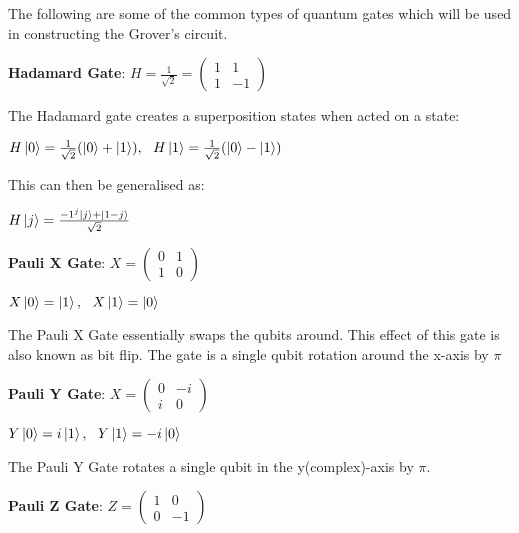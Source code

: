 \documentclass{article}
\begin{document}
\noindent
The following are some of the common types of quantum gates which will be used in constructing the Grover's circuit.
\vspace{5mm}

\textbf{Hadamard Gate}: \qquad $H = \frac{1}{\sqrt{2}}= \begin{pmatrix} 1 & 1 \\ 1 & -1 \end{pmatrix}$
\vspace{5mm}

\noindent
The Hadamard gate creates a superposition states when acted on a state:
\vspace{5mm}


\qquad $H\ket{0} = \frac{1}{\sqrt{2}} (\ket{0} + \ket{1}), \ \ H\ket{1} = \frac{1}{\sqrt{2}}(\ket{0} - \ket{1}) $
\vspace{5mm}

\noindent
This can then be generalised as:
\vspace{5mm}


\qquad $ H\ket{j} = \frac{-1^j\ket{j} + \ket{1 - j}}{\sqrt{2}} $
\vspace{5mm}


\textbf{Pauli X Gate}: \qquad $X = \begin{pmatrix} 0 & 1 \\ 1 & 0 \end{pmatrix}$
\vspace{5mm}


\qquad $X\ket{0} = \ket{1} , \ \ X\ket{1} = \ket{0}$
\vspace{5mm}

\noindent
The Pauli X Gate essentially swaps the qubits around. This effect of this gate is also known as bit flip. The gate is a single qubit rotation around the x-axis by $\pi$
\vspace{5mm}


\textbf{Pauli Y Gate}: \qquad $X = \begin{pmatrix} 0 & -i \\ i & 0 \end{pmatrix}$
\vspace{5mm}


\qquad $Y\ket{0} = i\ket{1} , \ \ Y\ket{1} = -i\ket{0}$
\vspace{5mm}

\noindent
The Pauli Y Gate rotates a single qubit in the y(complex)-axis by $\pi$.
\pagebreak


\textbf{Pauli Z Gate}: \qquad $Z = \begin{pmatrix} 1 & 0 \\ 0 & -1 \end{pmatrix}$
\vspace{5mm}
\end{document}
